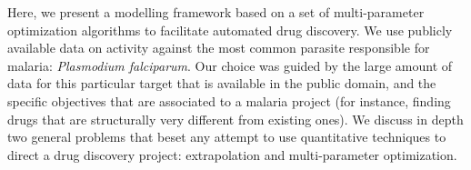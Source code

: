 \documentclass{article}
\begin{document}
Here, we present a modelling framework based on a set of multi-parameter optimization algorithms to facilitate automated drug discovery.
We use publicly available data on activity against the most common parasite responsible for malaria: \textit{Plasmodium falciparum}. Our choice was guided by the large amount of data for this particular target that is available in the public domain, and the specific objectives that are associated to a malaria project (for instance, finding drugs that are structurally very different from existing ones).  We discuss in depth two general problems that beset any attempt to use quantitative techniques to direct a drug discovery project: extrapolation and multi-parameter optimization.
\newline
\newline
\end{document}
